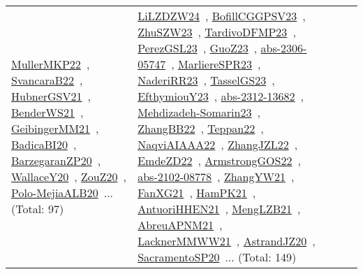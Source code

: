 {\begin{longtable}{lp{3cm}>{\raggedright\arraybackslash}p{6cm}>{\raggedright\arraybackslash}p{6cm}>{\raggedright\arraybackslash}p{8cm}}
\href{../works/MullerMKP22.pdf}{MullerMKP22}~\cite{MullerMKP22}, \href{../works/SvancaraB22.pdf}{SvancaraB22}~\cite{SvancaraB22}, \href{../works/HubnerGSV21.pdf}{HubnerGSV21}~\cite{HubnerGSV21}, \href{../works/BenderWS21.pdf}{BenderWS21}~\cite{BenderWS21}, \href{../works/GeibingerMM21.pdf}{GeibingerMM21}~\cite{GeibingerMM21}, \href{../works/BadicaBI20.pdf}{BadicaBI20}~\cite{BadicaBI20}, \href{../works/BarzegaranZP20.pdf}{BarzegaranZP20}~\cite{BarzegaranZP20}, \href{../works/WallaceY20.pdf}{WallaceY20}~\cite{WallaceY20}, \href{../works/ZouZ20.pdf}{ZouZ20}~\cite{ZouZ20}, \href{../works/Polo-MejiaALB20.pdf}{Polo-MejiaALB20}~\cite{Polo-MejiaALB20}... (Total: 97) & \href{../works/LiLZDZW24.pdf}{LiLZDZW24}~\cite{LiLZDZW24}, \href{../works/BofillCGGPSV23.pdf}{BofillCGGPSV23}~\cite{BofillCGGPSV23}, \href{../works/ZhuSZW23.pdf}{ZhuSZW23}~\cite{ZhuSZW23}, \href{../works/TardivoDFMP23.pdf}{TardivoDFMP23}~\cite{TardivoDFMP23}, \href{../works/PerezGSL23.pdf}{PerezGSL23}~\cite{PerezGSL23}, \href{../works/GuoZ23.pdf}{GuoZ23}~\cite{GuoZ23}, \href{../works/abs-2306-05747.pdf}{abs-2306-05747}~\cite{abs-2306-05747}, \href{../works/MarliereSPR23.pdf}{MarliereSPR23}~\cite{MarliereSPR23}, \href{../works/NaderiRR23.pdf}{NaderiRR23}~\cite{NaderiRR23}, \href{../works/TasselGS23.pdf}{TasselGS23}~\cite{TasselGS23}, \href{../works/EfthymiouY23.pdf}{EfthymiouY23}~\cite{EfthymiouY23}, \href{../works/abs-2312-13682.pdf}{abs-2312-13682}~\cite{abs-2312-13682}, \href{../works/Mehdizadeh-Somarin23.pdf}{Mehdizadeh-Somarin23}~\cite{Mehdizadeh-Somarin23}, \href{../works/ZhangBB22.pdf}{ZhangBB22}~\cite{ZhangBB22}, \href{../works/Teppan22.pdf}{Teppan22}~\cite{Teppan22}, \href{../works/NaqviAIAAA22.pdf}{NaqviAIAAA22}~\cite{NaqviAIAAA22}, \href{../works/ZhangJZL22.pdf}{ZhangJZL22}~\cite{ZhangJZL22}, \href{../works/EmdeZD22.pdf}{EmdeZD22}~\cite{EmdeZD22}, \href{../works/ArmstrongGOS22.pdf}{ArmstrongGOS22}~\cite{ArmstrongGOS22}, \href{../works/abs-2102-08778.pdf}{abs-2102-08778}~\cite{abs-2102-08778}, \href{../works/ZhangYW21.pdf}{ZhangYW21}~\cite{ZhangYW21}, \href{../works/FanXG21.pdf}{FanXG21}~\cite{FanXG21}, \href{../works/HamPK21.pdf}{HamPK21}~\cite{HamPK21}, \href{../works/AntuoriHHEN21.pdf}{AntuoriHHEN21}~\cite{AntuoriHHEN21}, \href{../works/MengLZB21.pdf}{MengLZB21}~\cite{MengLZB21}, \href{../works/AbreuAPNM21.pdf}{AbreuAPNM21}~\cite{AbreuAPNM21}, \href{../works/LacknerMMWW21.pdf}{LacknerMMWW21}~\cite{LacknerMMWW21}, \href{../works/AstrandJZ20.pdf}{AstrandJZ20}~\cite{AstrandJZ20}, \href{../works/SacramentoSP20.pdf}{SacramentoSP20}~\cite{SacramentoSP20}... (Total: 149)\\

\end{longtable}}
